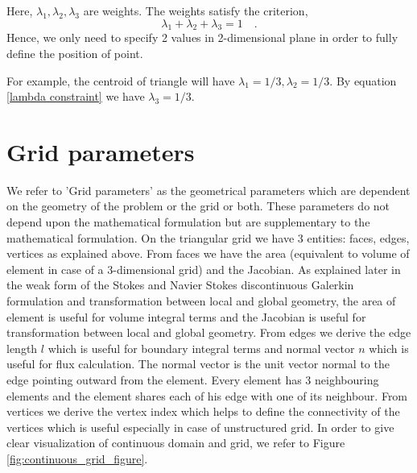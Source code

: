 \documentclass[a4paper,openany]{book}
\begin{document}
Here, $\lambda_1, \lambda_2, \lambda_3$ are weights. The weights satisfy the criterion, 
\begin{equation}\label{lambda constraint} 
\lambda_1 + \lambda_2 + \lambda_3 = 1 \quad \textrm{.}
\end{equation}
Hence, we only need to specify 2 values in 2-dimensional plane in order to fully define the position of point.

For example, the centroid of triangle will have $\lambda_1 = 1/3, \lambda_2 = 1/3$. By equation \eqref{lambda constraint} we have $\lambda_3=1/3$.

\section{Grid parameters}

We refer to 'Grid parameters' as the geometrical parameters which are dependent on the geometry of the problem or the grid or both. These parameters do not depend upon the mathematical formulation but are supplementary to the mathematical formulation. On the triangular grid we have 3 entities: faces, edges, vertices as explained above. From faces we have the area (equivalent to volume of element in case of a 3-dimensional grid) and the Jacobian. As explained later in the weak form of the Stokes and Navier Stokes discontinuous Galerkin formulation and transformation between local and global geometry, the area of element is useful for volume integral terms and the Jacobian is useful for transformation between local and global geometry. From edges we derive the edge length $l$ which is useful for boundary integral terms and normal vector $n$ which is useful for flux calculation. The normal vector is the unit vector normal to the edge pointing outward from the element. Every element has 3 neighbouring elements and the element shares each of his edge with one of its neighbour. From vertices we derive the vertex index which helps to define the connectivity of the vertices which is useful especially in case of unstructured grid. In order to give clear visualization of continuous domain and grid, we refer to Figure \ref{fig:continuous_grid_figure}.
\end{document}
